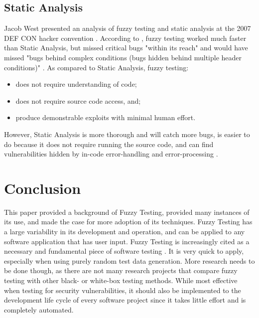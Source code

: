 \documentclass[10pt, final, journal, letterpaper, twoside, twocolumn]{IEEEtran}
\begin{document}
	\subsection{Static Analysis}
		Jacob West presented an analysis of fuzzy testing and static analysis at the 2007 DEF CON hacker convention \cite{defcon5}. According to \cite{defcon5}, fuzzy testing worked much faster than Static Analysis, but missed critical bugs "within its reach" and would have missed "bugs behind complex conditions (bugs hidden behind multiple header conditions)" \cite{defcon5}. As compared to Static Analysis, fuzzy testing:
		\begin{itemize}
			\item{does not require understanding of code;}
			\item{does not require source code access, and;}
			\item{produce demonstrable exploits with minimal human effort.}
		\end{itemize}
		However, Static Analysis is more thorough and will catch more bugs, is easier to do because it does not require running the source code, and can find vulnerabilities hidden by in-code error-handling and error-processing \cite{defcon5}.

\section{\label{sec:conclude}Conclusion}
	This paper provided a background of Fuzzy Testing, provided many instances of its use, and made the case for more adoption of its techniques. Fuzzy Testing has a large variability in its development and operation, and can be applied to any software application that has user input. Fuzzy Testing is increasingly cited as a necessary and fundamental piece of software testing \cite{automation}. It is very quick to apply, especially when using purely random test data generation. More research needs to be done though, as there are not many research projects that compare fuzzy testing with other black- or white-box testing methods. While most effective when testing for security vulnerabilities, it should also be implemented to the development life cycle of every software project since it takes little effort and is completely automated.
	
	
\newpage


\end{document}

